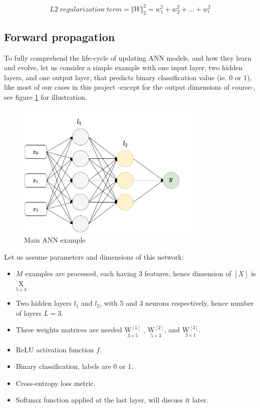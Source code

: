 \begin{equation} \label{eq:l2_reg}
    L2\; regularization\; term = \Vert W \Vert_2^2 = w_1^2 + w_2^2 +  ... + w_l^2
\end{equation}


\subsection{Forward propagation}
To fully comprehend the life-cycle of updating ANN models, and how they learn and evolve, let us consider a simple example with one input layer, two hidden layers, and one output layer, that predicts binary classification value (ie. 0 or 1), like most of our cases in this project -except for the output dimensions of course-, see figure \ref{fig:main_example} for illustration.\newline

\begin{figure}
    \centering
    \includegraphics[width=0.8\textwidth]{images/ann_2.png}
    \caption{Main ANN example}
    \label{fig:main_example}
\end{figure}

Let us assume parameters and dimensions of this network:
\begin{itemize} 
    \item $M$ examples are processed, each having 3 features, hence dimension of $[X]$ is $\underset{5\times 3}{\mathrm{X}}$
    \item Two hidden layers $l_1$ and $l_2$, with 5 and 3 neurons respectively, hence number of layers $L = 3$.
    \item Three weights matrices are needed $\underset{3\times 5}{\mathrm{W^{[1]}}}$ , $\underset{5\times 3}{\mathrm{W^{[2]}}}$, and $\underset{3\times 1}{\mathrm{W^{[3]}}}$.
    \item ReLU activation function $f$.
    \item Binary classification, labels are 0 or 1.
    \item Cross-entropy loss metric.
    \item Softmax function applied at the last layer, will discuss it later.
\end{itemize}

